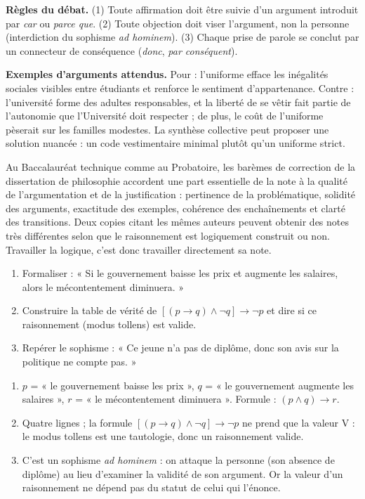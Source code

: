 \documentclass[11pt]{article}
\begin{document}
\textbf{Règles du débat.} (1) Toute affirmation doit être suivie d'un argument introduit par \emph{car} ou \emph{parce que}. (2) Toute objection doit viser l'argument, non la personne (interdiction du sophisme \emph{ad hominem}). (3) Chaque prise de parole se conclut par un connecteur de conséquence (\emph{donc}, \emph{par conséquent}).

\textbf{Exemples d'arguments attendus.} Pour : l'uniforme efface les inégalités sociales visibles entre étudiants et renforce le sentiment d'appartenance. Contre : l'université forme des adultes responsables, et la liberté de se vêtir fait partie de l'autonomie que l'Université doit respecter ; de plus, le coût de l'uniforme pèserait sur les familles modestes. La synthèse collective peut proposer une solution nuancée : un code vestimentaire minimal plutôt qu'un uniforme strict.

\begin{savaistu}
Au Baccalauréat technique comme au Probatoire, les barèmes de correction de la dissertation de philosophie accordent une part essentielle de la note à la qualité de l'argumentation et de la justification : pertinence de la problématique, solidité des arguments, exactitude des exemples, cohérence des enchaînements et clarté des transitions. Deux copies citant les mêmes auteurs peuvent obtenir des notes très différentes selon que le raisonnement est logiquement construit ou non. Travailler la logique, c'est donc travailler directement sa note.
\end{savaistu}

\begin{exercice}
\begin{enumerate}
\item Formaliser : « Si le gouvernement baisse les prix et augmente les salaires, alors le mécontentement diminuera. »
\item Construire la table de vérité de $[(p \to q) \wedge \neg q] \to \neg p$ et dire si ce raisonnement (modus tollens) est valide.
\item Repérer le sophisme : « Ce jeune n'a pas de diplôme, donc son avis sur la politique ne compte pas. »
\end{enumerate}
\end{exercice}

\begin{corrige}[Exercice]
\begin{enumerate}
\item $p$ = « le gouvernement baisse les prix », $q$ = « le gouvernement augmente les salaires », $r$ = « le mécontentement diminuera ». Formule : $(p \wedge q) \to r$.
\item Quatre lignes ; la formule $[(p \to q) \wedge \neg q] \to \neg p$ ne prend que la valeur V : le modus tollens est une tautologie, donc un raisonnement valide.
\item C'est un sophisme \emph{ad hominem} : on attaque la personne (son absence de diplôme) au lieu d'examiner la validité de son argument. Or la valeur d'un raisonnement ne dépend pas du statut de celui qui l'énonce.
\end{enumerate}
\end{corrige}
\end{document}

